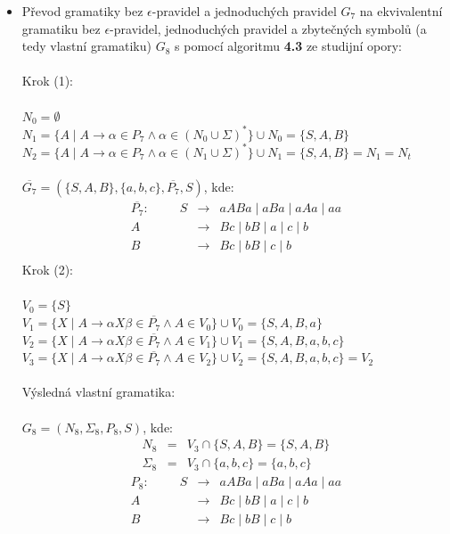 \documentclass[a4paper,11pt]{article}[24.3.2010]
\begin{document}
\begin{enumerate}
\begin{itemize}
      \item Převod gramatiky bez $\epsilon$-pravidel a jednoduchých pravidel $G_{7}$ na ekvivalentní gramatiku bez $\epsilon$-pravidel, jednoduchých pravidel a zbytečných symbolů (a tedy vlastní gramatiku) $G_{8}$ s pomocí algoritmu \textbf{4.3} ze studijní opory:\\\\
      Krok (1):\\\\
      $N_{0} = \emptyset$\\
      $N_{1} = \{A \mid A \rightarrow \alpha \in P_{7} \wedge \alpha \in (N_{0} \cup \Sigma)^{*}\} \cup N_{0} = \{S,A,B\}$\\
      $N_{2} = \{A \mid A \rightarrow \alpha \in P_{7} \wedge \alpha \in (N_{1} \cup \Sigma)^{*}\} \cup N_{1} = \{S,A,B\} = N_{1} =  N_{t}$\\\\
      $\overline{G_{7}} = (\{S,A,B\}, \{a,b,c\},\overline{P_{7}},S)$, kde:\\
     \begin{eqnarray*}
      \overline{P_{7}}: \:\:\:\:\:\:\:\:\:\:\: S&\rightarrow&aABa \mid aBa \mid aAa \mid aa\\
      A&\rightarrow&Bc \mid bB \mid a \mid c \mid b\\
      B&\rightarrow&Bc \mid bB \mid c \mid b\\
     \end{eqnarray*}
      Krok (2):\\\\
      $V_{0} = \{S\}$\\
      $V_{1} = \{X \mid A \rightarrow \alpha X \beta \in \overline{P_{7}} \wedge A \in V_{0}\} \cup V_{0} = \{S,A,B,a\}$\\
      $V_{2} = \{X \mid A \rightarrow \alpha X \beta \in \overline{P_{7}} \wedge A \in V_{1}\} \cup V_{1} = \{S,A,B,a,b,c\}$\\
      $V_{3} = \{X \mid A \rightarrow \alpha X \beta \in \overline{P_{7}} \wedge A \in V_{2}\} \cup V_{2} = \{S,A,B,a,b,c\} = V_{2}$\\\\
      Výsledná vlastní gramatika:\\\\$G_{8}=(N_{8}, \Sigma_{8},P_{8},S)$, kde:
      \begin{eqnarray*}
        N_{8}&=&V_{3} \cap \{S,A,B\}=\{S,A,B\}\\
        \Sigma_{8}&=&V_{3} \cap \{a,b,c\}=\{a,b,c\}
      \end{eqnarray*}
      \begin{eqnarray*}
      P_{8}: \:\:\:\:\:\:\:\:\:\:\: S&\rightarrow&aABa \mid aBa \mid aAa \mid aa\\
      A&\rightarrow&Bc \mid bB \mid a \mid c \mid b\\
      B&\rightarrow&Bc \mid bB \mid c \mid b\\
     \end{eqnarray*}
    \end{itemize}


\end{enumerate}
\end{document}
